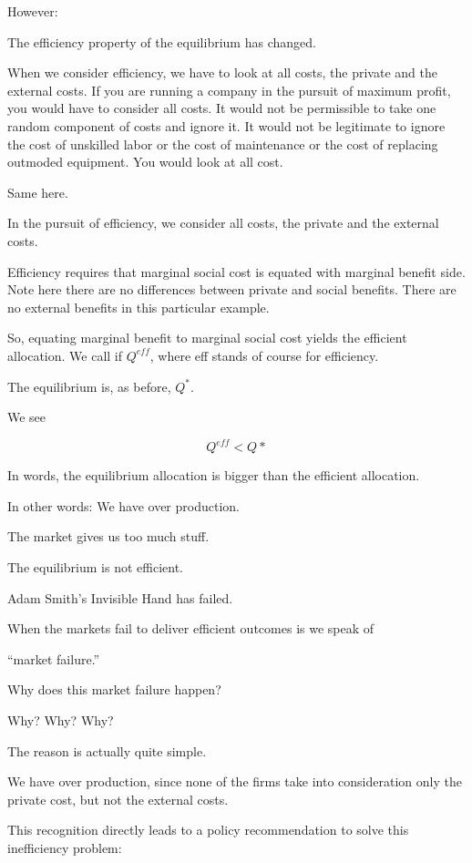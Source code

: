 \documentclass[
]{book}
\begin{document}
However:

The efficiency property of the equilibrium has changed.

When we consider efficiency, we have to look at all costs, the private and the external costs. If you are running a company in the pursuit of maximum profit, you would have to consider all costs. It would not be permissible to take one random component of costs and ignore it. It would not be legitimate to ignore the cost of unskilled labor or the cost of maintenance or the cost of replacing outmoded equipment. You would look at all cost.

Same here.

In the pursuit of efficiency, we consider all costs, the private and the external costs.

Efficiency requires that marginal social cost is equated with marginal benefit side. Note here there are no differences between private and social benefits. There are no external benefits in this particular example.

So, equating marginal benefit to marginal social cost yields the efficient allocation. We call if \(Q^{eff}\), where eff stands of course for efficiency.

The equilibrium is, as before, \(Q^*\).

We see

\[Q^{eff} < Q*\]

In words, the equilibrium allocation is bigger than the efficient allocation.

In other words: We have over production.

The market gives us too much stuff.

The equilibrium is not efficient.

Adam Smith's Invisible Hand has failed.

When the markets fail to deliver efficient outcomes is we speak of

\begin{center}
``market failure.''

\end{center}

Why does this market failure happen?

Why? Why? Why?

The reason is actually quite simple.

We have over production, since none of the firms take into consideration only the private cost, but not the external costs.

This recognition directly leads to a policy recommendation to solve this inefficiency problem:
\end{document}
